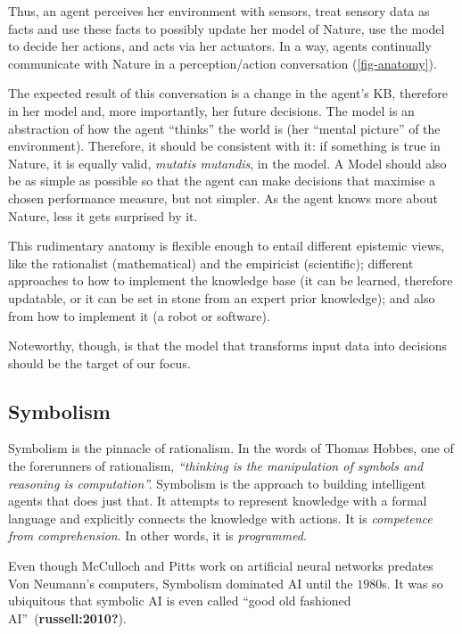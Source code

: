 \documentclass[
  letterpaper,
  DIV=11,
  numbers=noendperiod,
  oneside]{scrreprt}
\begin{document}
Thus, an agent perceives her environment with sensors, treat sensory
data as facts and use these facts to possibly update her model of
Nature, use the model to decide her actions, and acts via her actuators.
In a way, agents continually communicate with Nature in a
perception/action conversation
(\protect\hyperlink{fig-anatomy}{{[}fig-anatomy{]}}).

The expected result of this conversation is a change in the agent's
{KB}, therefore in her model and, more importantly, her future
decisions. The model is an abstraction of how the agent ``thinks'' the
world is (her ``mental picture'' of the environment). Therefore, it
should be consistent with it: if something is true in Nature, it is
equally valid, \emph{mutatis mutandis}, in the model. A Model should
also be as simple as possible so that the agent can make decisions that
maximise a chosen performance measure, but not simpler. As the agent
knows more about Nature, less it gets surprised by it.

This rudimentary anatomy is flexible enough to entail different
epistemic views, like the rationalist (mathematical) and the empiricist
(scientific); different approaches to how to implement the knowledge
base (it can be learned, therefore updatable, or it can be set in stone
from an expert prior knowledge); and also from how to implement it (a
robot or software).

Noteworthy, though, is that the model that transforms input data into
decisions should be the target of our focus.

\hypertarget{symbolism}{%
\subsection{Symbolism}\label{symbolism}}

Symbolism is the pinnacle of rationalism. In the words of Thomas Hobbes,
one of the forerunners of rationalism, \emph{``thinking is the
manipulation of symbols and reasoning is computation''.} Symbolism is
the approach to building intelligent agents that does just that. It
attempts to represent knowledge with a formal language and explicitly
connects the knowledge with actions. It is \emph{competence from
comprehension}. In other words, it is \emph{programmed}.

Even though McCulloch and Pitts work on artificial neural networks
predates Von Neumann's computers, Symbolism dominated {AI} until the
\(1980\)s. It was so ubiquitous that symbolic {AI} is even called ``good
old fashioned AI''~(\textbf{russell:2010?}).
\end{document}
